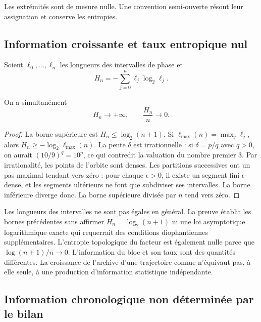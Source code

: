 Les extrémités sont de mesure nulle. Une convention semi-ouverte résout leur assignation et conserve les entropies.

\subsection{Information croissante et taux entropique nul}
\label{md:cron:crecimiento}

Soient $\ell_0,\ldots,\ell_n$ les longueurs des intervalles de phase et
\begin{equation}
 H_n=-\sum_{j=0}^{n}\ell_j\log_2\ell_j.
 \label{md:cron:entropia-bloque}
\end{equation}

\begin{proposition}
\label{md:cron:proposicion-tasa}
On a simultanément
\begin{equation}
 H_n\longrightarrow+\infty,\qquad
 \frac{H_n}{n}\longrightarrow0.
 \label{md:cron:dos-limites}
\end{equation}
\end{proposition}
\begin{proof}
La borne supérieure est $H_n\leq\log_2(n+1)$. Si $\ell_{\max}(n)=\max_j\ell_j$, alors $H_n\geq-\log_2\ell_{\max}(n)$. La pente $\delta$ est irrationnelle : si $\delta=p/q$ avec $q>0$, on aurait $(10/9)^q=10^p$, ce qui contredit la valuation du nombre premier $3$. Par irrationalité, les points de l'orbite sont denses. Les partitions successives ont un pas maximal tendant vers zéro : pour chaque $\epsilon>0$, il existe un segment fini $\epsilon$-dense, et les segments ultérieurs ne font que subdiviser ses intervalles. La borne inférieure diverge donc. La borne supérieure divisée par $n$ tend vers zéro.
\end{proof}

Les longueurs des intervalles ne sont pas égales en général. La preuve établit les bornes précédentes sans affirmer $H_n=\log_2(n+1)$ ni une loi asymptotique logarithmique exacte qui requerrait des conditions diophantiennes supplémentaires. L'entropie topologique du facteur est également nulle parce que $\log(n+1)/n\to0$. L'information du bloc et son taux sont des quantités différentes. La croissance de l'archive d'une trajectoire connue n'équivaut pas, à elle seule, à une production d'information statistique indépendante.

\subsection{Information chronologique non déterminée par le bilan}
\label{md:cron:condicional}

